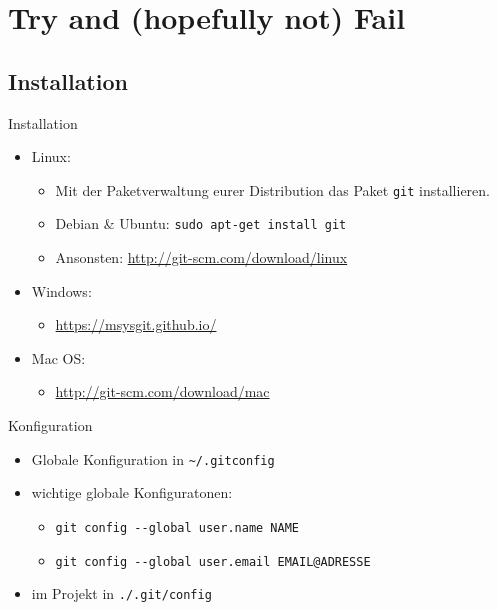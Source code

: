 \documentclass{beamer}
\begin{document}
\section{Try and (hopefully not) Fail}
\subsection{Installation}
\begin{frame}[fragile]{Installation}
	\begin{itemize}
		\item Linux:
			\begin{itemize}
				\item Mit der Paketverwaltung eurer Distribution das Paket \verb|git| installieren.
				\item Debian \& Ubuntu: \verb|sudo apt-get install git|
				\item Ansonsten: \url{http://git-scm.com/download/linux}
			\end{itemize}
		\item Windows:
			\begin{itemize}
				\item \url{https://msysgit.github.io/}
			\end{itemize}
		\item Mac OS:
			\begin{itemize}
				\item \url{http://git-scm.com/download/mac}
			\end{itemize}
	\end{itemize}
\end{frame}

\begin{frame}[fragile]{Konfiguration}
	\begin{itemize}
		\item Globale Konfiguration in \verb+~/.gitconfig+
		\item wichtige globale Konfiguratonen:
			\begin{itemize}
				\item \verb+git config --global user.name NAME+
				\item \verb+git config --global user.email EMAIL@ADRESSE+
			\end{itemize}
		\item im Projekt in \verb+./.git/config+
	\end{itemize}
\end{frame}
\end{document}
